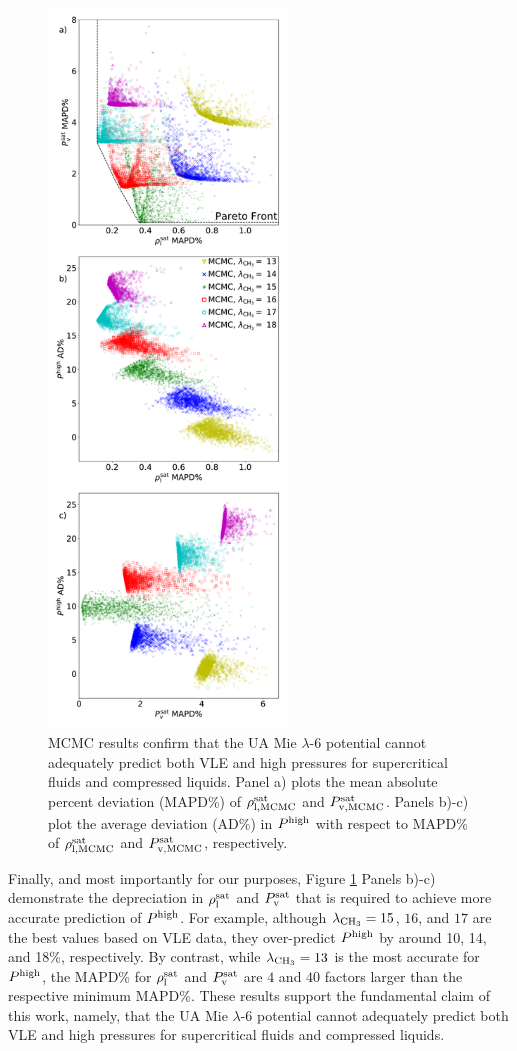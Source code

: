 \documentclass[preprint,letterpaper,floatfix,citeautoscript,aip,jcp]{revtex4-1}
\begin{document}
\begin{figure}[p!]
	\centering
	\includegraphics[width=2.5in]{MCMC_Mie_13_14_15_16_17_18_ethane_Pareto}
	\caption{MCMC results confirm that the UA Mie $\lambda$-6 potential cannot adequately predict both VLE and high pressures for supercritical fluids and compressed liquids. Panel a) plots the mean absolute percent deviation (MAPD\%) of $\rho_{\rm l, MCMC}^{\rm sat}$ and $P_{\rm v, MCMC}^{\rm sat}$. Panels b)-c) plot the average deviation (AD\%) in $P^{\rm high}$ with respect to MAPD\% of $\rho_{\rm l, MCMC}^{\rm sat}$ and $P_{\rm v, MCMC}^{\rm sat}$, respectively.}
	\label{fig:MCMC_Mie_13_14_15_16_17_18_ethane_Pareto}
\end{figure} 


Finally, and most importantly for our purposes, Figure \ref{fig:MCMC_Mie_13_14_15_16_17_18_ethane_Pareto} Panels b)-c) demonstrate the depreciation in $\rho_{\rm l}^{\rm sat}$ and $P_{\rm v}^{\rm sat}$ that is required to achieve more accurate prediction of $P^{\rm high}$. For example, although $\lambda_{\rm CH_3} = 15$, $16$, and $17$ are the best values based on VLE data, they over-predict $P^{\rm high}$ by around 10, 14, and 18\%, respectively. By contrast, while $\lambda_{\rm CH_3} = 13$ is the most accurate for $P^{\rm high}$, the MAPD\% for $\rho_{\rm l}^{\rm sat}$ and $P_{\rm v}^{\rm sat}$ are $4$ and $40$ factors larger than the respective minimum MAPD\%. These results support the fundamental claim of this work, namely, that the UA Mie $\lambda$-6 potential cannot adequately predict both VLE and high pressures for supercritical fluids and compressed liquids. 
\end{document}
